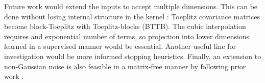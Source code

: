 \documentclass{article}
\begin{document}
Future work would extend the inputs to accept multiple dimensions. This can be done without losing internal structure in the kernel \cite{msgp}: Toeplitz covariance matrices become block-Toeplitz with Toeplitz-blocks (BTTB). The cubic interpolation requires and exponential number of terms, so projection into lower dimensions learned in a supervised manner would be essential. Another useful line for investigation would be more informed stopping heuristics. Finally, an extension to non-Gaussian noise is also feasible in a matrix-free manner by following prior work \cite{cutajar2016preconditioning}.



\end{document}
